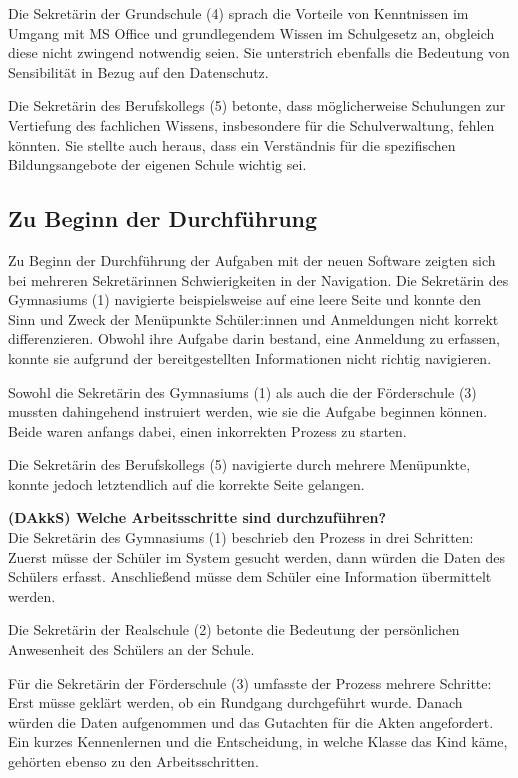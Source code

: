 Die Sekretärin der Grundschule (4) sprach die Vorteile von Kenntnissen im Umgang mit MS Office und grundlegendem Wissen im Schulgesetz an, obgleich diese nicht zwingend notwendig seien. Sie unterstrich ebenfalls die Bedeutung von Sensibilität in Bezug auf den Datenschutz.

Die Sekretärin des Berufskollegs (5) betonte, dass möglicherweise Schulungen zur Vertiefung des fachlichen Wissens, insbesondere für die Schulverwaltung, fehlen könnten. Sie stellte auch heraus, dass ein Verständnis für die spezifischen Bildungsangebote der eigenen Schule wichtig sei.


\subsection{Zu Beginn der Durchführung}
Zu Beginn der Durchführung der Aufgaben mit der neuen Software zeigten sich bei mehreren Sekretärinnen Schwierigkeiten in der Navigation. Die Sekretärin des Gymnasiums (1) navigierte beispielsweise auf eine leere Seite und konnte den Sinn und Zweck der Menüpunkte \glqq Schüler:innen\grqq{} und \glqq Anmeldungen\grqq{} nicht korrekt differenzieren. Obwohl ihre Aufgabe darin bestand, eine Anmeldung zu erfassen, konnte sie aufgrund der bereitgestellten Informationen nicht richtig navigieren.

Sowohl die Sekretärin des Gymnasiums (1) als auch die der Förderschule (3) mussten dahingehend instruiert werden, wie sie die Aufgabe beginnen können. Beide waren anfangs dabei, einen inkorrekten Prozess zu starten.

Die Sekretärin des Berufskollegs (5) navigierte durch mehrere Menüpunkte, konnte jedoch letztendlich auf die korrekte Seite gelangen. 

\textbf{(DAkkS) Welche Arbeitsschritte sind durchzuführen?}\\
Die Sekretärin des Gymnasiums (1) beschrieb den Prozess in drei Schritten: Zuerst müsse der Schüler im System gesucht werden, dann würden die Daten des Schülers erfasst. Anschließend müsse dem Schüler eine Information übermittelt werden.

Die Sekretärin der Realschule (2) betonte die Bedeutung der persönlichen Anwesenheit des Schülers an der Schule.

Für die Sekretärin der Förderschule (3) umfasste der Prozess mehrere Schritte: Erst müsse geklärt werden, ob ein Rundgang durchgeführt wurde. Danach würden die Daten aufgenommen und das Gutachten für die Akten angefordert. Ein kurzes Kennenlernen und die Entscheidung, in welche Klasse das Kind käme, gehörten ebenso zu den Arbeitsschritten.

